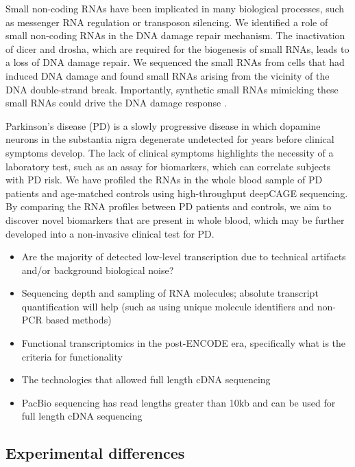 \setlength{\parskip}{\baselineskip}%
\setlength{\parindent}{0pt}%

Small non-coding RNAs have been implicated in many biological processes, such as messenger RNA regulation or transposon silencing. We identified a role of small non-coding RNAs in the DNA damage repair mechanism. The inactivation of dicer and drosha, which are required for the biogenesis of small RNAs, leads to a loss of DNA damage repair. We sequenced the small RNAs from cells that had induced DNA damage and found small RNAs arising from the vicinity of the DNA double-strand break. Importantly, synthetic small RNAs mimicking these small RNAs could drive the DNA damage response \cite{francia2012site}.

Parkinson’s disease (PD) is a slowly progressive disease in which dopamine neurons in the substantia nigra degenerate undetected for years before clinical symptoms develop. The lack of clinical symptoms highlights the necessity of a laboratory test, such as an assay for biomarkers, which can correlate subjects with PD risk. We have profiled the RNAs in the whole blood sample of PD patients and age-matched controls using high-throughput deepCAGE sequencing. By comparing the RNA profiles between PD patients and controls, we aim to discover novel biomarkers that are present in whole blood, which may be further developed into a non-invasive clinical test for PD.

\begin{itemize}
   \item Are the majority of detected low-level transcription due to technical artifacts and/or background biological noise?
   \item Sequencing depth and sampling of RNA molecules; absolute transcript quantification will help (such as using unique molecule identifiers and non-PCR based methods)
   \item Functional transcriptomics in the post-ENCODE era, specifically what is the criteria for functionality
   \item The technologies that allowed full length cDNA sequencing
   \item PacBio sequencing has read lengths greater than 10kb and can be used for full length cDNA sequencing
\end{itemize}

\subsection{Experimental differences}

